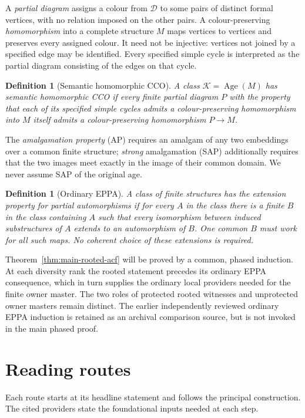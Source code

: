 \documentclass[11pt,a4paper]{article}
\newtheorem{definition}[theorem]{Definition}
\theoremstyle{remark}\newtheorem{remark}[theorem]{Remark}
\newcommand{\Age}{\operatorname{Age}}
\theoremstyle{definition}
\theoremstyle{remark}
\providecommand{\Age}{\operatorname{Age}}
\begin{document}
A \emph{partial diagram} assigns a colour from $\mathcal D$ to some pairs
of distinct formal vertices, with no relation imposed on the other pairs.
A colour-preserving \emph{homomorphism} into a complete structure $M$ maps
vertices to vertices and preserves every assigned colour. It need not be
injective: vertices not joined by a specified edge may be identified.
Every specified simple cycle is interpreted as the partial diagram
consisting of the edges on that cycle.

\begin{definition}[Semantic homomorphic CCO]
A class $\mathcal K=\Age(M)$ has \emph{semantic homomorphic CCO} if every
finite partial diagram $P$ with the property that each of its specified
simple cycles admits a colour-preserving homomorphism into $M$ itself
admits a colour-preserving homomorphism $P\to M$.
\end{definition}

The \emph{amalgamation property} (AP) requires an amalgam of any two
embeddings over a common finite structure; \emph{strong} amalgamation
(SAP) additionally requires that the two images meet exactly in the image
of their common domain. We never assume SAP of the original age.

\begin{definition}[Ordinary EPPA]
A class of finite structures has the \emph{extension property for partial
automorphisms} if for every $A$ in the class there is a finite $B$ in
the class containing $A$ such that \emph{every} isomorphism between
induced substructures of $A$ extends to an automorphism of $B$.
One common $B$ must work for all such maps. No coherent choice of these
extensions is required.
\end{definition}

Theorem~\ref{thm:main-rooted-acf} will be proved by a common,
phased induction.  At each diversity rank the rooted statement
precedes its ordinary EPPA consequence, which in turn supplies the
ordinary local providers needed for the finite owner master.
The two roles of protected rooted witnesses and unprotected
owner masters remain distinct.  The earlier independently reviewed
ordinary EPPA induction is retained as an archival comparison
source, but is not invoked in the main phased proof.

\section*{Reading routes}
Each route starts at its headline statement and follows the principal
construction. The cited providers state the foundational inputs needed
at each step.
\end{document}
